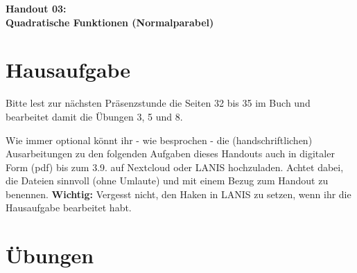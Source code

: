 \documentclass[a4paper,ngerman,12pt]{exam}
\begin{document}
\vspace*{0.3cm}
\begin{center}
  \huge\bfseries Handout 03:\\ Quadratische Funktionen (Normalparabel)
\end{center}

\section*{Hausaufgabe}

\par Bitte lest zur nächsten Präsenzstunde die Seiten 32 bis 35 im Buch und bearbeitet damit die Übungen 3, 5 und 8.

\par Wie immer optional könnt ihr - wie besprochen - die (handschriftlichen) Ausarbeitungen zu den folgenden Aufgaben dieses Handouts auch in digitaler Form (pdf) bis zum 3.9. auf Nextcloud oder LANIS hochzuladen. Achtet dabei, die Dateien sinnvoll (ohne Umlaute) und mit einem Bezug zum Handout zu benennen. \textbf{Wichtig:} Vergesst nicht, den Haken in LANIS zu setzen, wenn ihr die Hausaufgabe bearbeitet habt.

\section*{Übungen}
\end{document}
